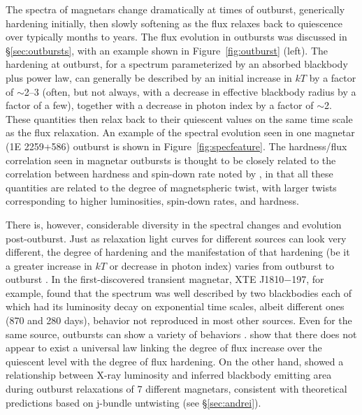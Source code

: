 The spectra of magnetars change dramatically at times of outburst,
generically hardening initially, then slowly softening as the flux
relaxes back to quiescence over typically months to years.  The flux
evolution in outbursts was discussed in \S\ref{sec:outbursts}, with an
example shown in Figure~\ref{fig:outburst} (left).
The hardening at outburst, for a spectrum parameterized by an absorbed
blackbody plus power law, can generally be described by an initial increase
in $kT$ by a factor of $\sim$2--3 (often, but not always, with a decrease in effective blackbody
radius by a factor of a few), together with a decrease in photon index
by a factor of $\sim$2.  These quantities then relax back to their
quiescent values on the same time scale as the flux relaxation.  
An example of the spectral evolution seen in one magnetar (1E 2259+586)
outburst is shown in Figure~\ref{fig:specfeature}.
The hardness/flux correlation seen in magnetar outbursts is thought to
be closely related to the correlation between hardness and spin-down rate
noted by \citet{mw01}, in that all these quantities
are related to the degree of magnetspheric twist, with larger twists corresponding
to higher luminosities, spin-down rates, and hardness.  

There is, however, considerable diversity in the spectral changes and evolution
post-outburst.  Just as relaxation light curves for different sources can
look very different, the degree of hardening
and the manifestation of that hardening (be it a greater increase in $kT$ or decrease
in photon index) varies from outburst to outburst \citep{re11}.  
In the first-discovered transient magnetar, XTE J1810$-$197, for example,
\citet{gh07} found that the spectrum was well described by two blackbodies each
of which had its luminosity decay on exponential time scales, albeit different ones (870 and 280 days),
behavior not reproduced in most other sources.
Even for the same source, outbursts can show a variety
of behaviors \citep{ier+10,nkd+11,khdu12}.
\citet{sk11} show that there does not appear to exist a universal law linking the degree
of flux increase over the quiescent level with the degree of flux
hardening.   On the other hand, \citet{bl16} showed a relationship
between X-ray luminosity and inferred blackbody emitting area during outburst relaxations
of 7 different magnetars, consistent with theoretical predictions based on j-bundle
untwisting (see \S\ref{sec:andrei}).



